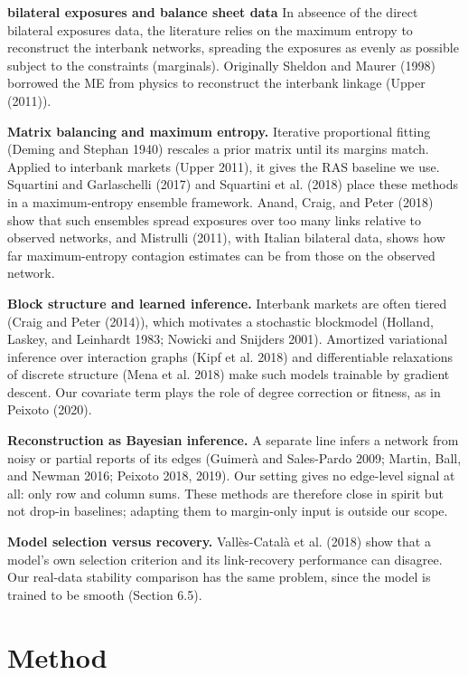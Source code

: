 \documentclass[
  a4paper,
]{article}
\begin{document}
\textbf{bilateral exposures and balance sheet data} In abseence of the
direct bilateral exposures data, the literature relies on the maximum
entropy to reconstruct the interbank networks, spreading the exposures
as evenly as possible subject to the constraints (marginals). Originally
Sheldon and Maurer (1998) borrowed the ME from physics to reconstruct
the interbank linkage (Upper (2011)).

\textbf{Matrix balancing and maximum entropy.} Iterative proportional
fitting (Deming and Stephan 1940) rescales a prior matrix until its
margins match. Applied to interbank markets (Upper 2011), it gives the
RAS baseline we use. Squartini and Garlaschelli (2017) and Squartini et
al. (2018) place these methods in a maximum-entropy ensemble framework.
Anand, Craig, and Peter (2018) show that such ensembles spread exposures
over too many links relative to observed networks, and Mistrulli (2011),
with Italian bilateral data, shows how far maximum-entropy contagion
estimates can be from those on the observed network.

\textbf{Block structure and learned inference.} Interbank markets are
often tiered (Craig and Peter (2014)), which motivates a stochastic
blockmodel (Holland, Laskey, and Leinhardt 1983; Nowicki and Snijders
2001). Amortized variational inference over interaction graphs (Kipf et
al. 2018) and differentiable relaxations of discrete structure (Mena et
al. 2018) make such models trainable by gradient descent. Our covariate
term plays the role of degree correction or fitness, as in Peixoto
(2020).

\textbf{Reconstruction as Bayesian inference.} A separate line infers a
network from noisy or partial reports of its edges (Guimerà and
Sales-Pardo 2009; Martin, Ball, and Newman 2016; Peixoto 2018, 2019).
Our setting gives no edge-level signal at all: only row and column sums.
These methods are therefore close in spirit but not drop-in baselines;
adapting them to margin-only input is outside our scope.

\textbf{Model selection versus recovery.} Vallès-Català et al. (2018)
show that a model's own selection criterion and its link-recovery
performance can disagree. Our real-data stability comparison has the
same problem, since the model is trained to be smooth (Section 6.5).

\section{Method}\label{sec-methodology-exposure-reconstruction}
\end{document}
